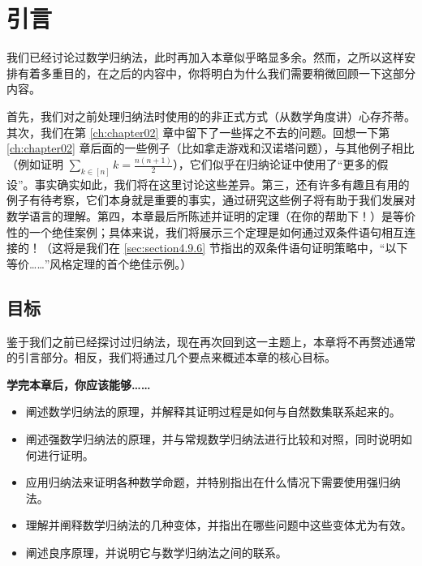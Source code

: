 \section{引言}

我们已经讨论过数学归纳法，此时再加入本章似乎略显多余。然而，之所以这样安排有着多重目的，在之后的内容中，你将明白为什么我们需要稍微回顾一下这部分内容。

首先，我们对之前处理归纳法时使用的的非正式方式（从数学角度讲）心存芥蒂。其次，我们在第 \ref{ch:chapter02} 章中留下了一些挥之不去的问题。回想一下第 \ref{ch:chapter02} 章后面的一些例子（比如拿走游戏和汉诺塔问题），与其他例子相比（例如证明 $\sum_{k \in [n]} k=\frac{n(n+1)}{2}$），它们似乎在归纳论证中使用了``更多的假设''。事实确实如此，我们将在这里讨论这些差异。第三，还有许多有趣且有用的例子有待考察，它们本身就是重要的事实，通过研究这些例子将有助于我们发展对数学语言的理解。第四，本章最后所陈述并证明的定理（在你的帮助下！）是等价性的一个绝佳案例；具体来说，我们将展示三个定理是如何通过双条件语句相互连接的！（这将是我们在 \ref{sec:section4.9.6} 节指出的双条件语句证明策略中，``以下等价……''风格定理的首个绝佳示例。）

\subsection{目标}

鉴于我们之前已经探讨过归纳法，现在再次回到这一主题上，本章将不再赘述通常的引言部分。相反，我们将通过几个要点来概述本章的核心目标。

\textbf{学完本章后，你应该能够……}

\begin{itemize}
    \item 阐述数学归纳法的原理，并解释其证明过程是如何与自然数集联系起来的。
    \item 阐述强数学归纳法的原理，并与常规数学归纳法进行比较和对照，同时说明如何进行证明。
    \item 应用归纳法来证明各种数学命题，并特别指出在什么情况下需要使用强归纳法。
    \item 理解并阐释数学归纳法的几种变体，并指出在哪些问题中这些变体尤为有效。
    \item 阐述良序原理，并说明它与数学归纳法之间的联系。
\end{itemize}